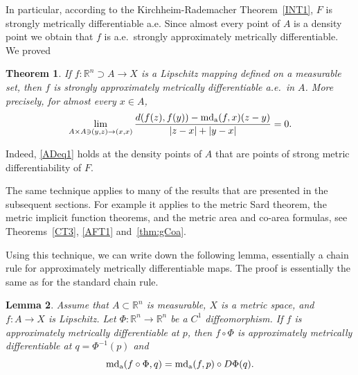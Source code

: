 \documentclass[12pt,leqno]{amsart}
\newtheorem{theorem}{Theorem}
\newtheorem{lemma}[theorem]{Lemma}
\theoremstyle{definition}
\newcommand{\bbbr}{\mathbb R}
\def\apmd{\operatorname{md_{\rm a}}}
\numberwithin{theorem}{section} \numberwithin{equation}{section}
\begin{document}
In particular, according to the Kirchheim-Rademacher Theorem~\ref{INT1}, $F$ is strongly metrically differentiable a.e. Since almost every point of $A$ is a density point we obtain that $f$ is a.e.\ strongly approximately metrically differentiable. We proved
\begin{theorem}
\label{thm:apKR}
If $f:\bbbr^n\supset A\to X$ is a Lipschitz mapping defined on a measurable set, then $f$ is strongly approximately metrically differentiable a.e.\ in $A$. More precisely, for almost every $x\in A$,
\begin{equation}
\label{ADeq1}
\lim_{A\times A\ni (y,z)\to(x,x)}\frac{d(f(z),f(y))-\apmd(f,x)(z-y)}{|z-x|+|y-x|}=0.
\end{equation}
\end{theorem}
Indeed, \eqref{ADeq1} holds at the density points of $A$ that are points of strong metric differentiability of $F$.

The same technique applies to many of the results that are presented in the subsequent sections. For example it applies to the metric Sard theorem, the metric implicit function theorems, and the metric area and co-area formulas, see Theorems~\ref{CT3}, \ref{AFT1} and~\ref{thm:gCoa}.

Using this technique, we can write down the following lemma, essentially a chain rule for approximately metrically differentiable maps. The proof is essentially the same as for the standard chain rule.
\begin{lemma}
\label{lem:chain}
Assume that $A\subset \bbbr^n$ is measurable, $X$ is a metric space,
and $f:A\to X$ is Lipschitz. Let $\Phi:\bbbr^n\to\bbbr^n$ be a $C^1$
diffeomorphism. If $f$ is approximately metrically differentiable at $p$, then $f\circ \Phi$ is approximately
metrically differentiable at $q=\Phi^{-1}(p)$ and
$$
\apmd(f\circ \Phi,q)=\apmd(f,p)\circ D\Phi(q).
$$
\end{lemma}
\end{document}

